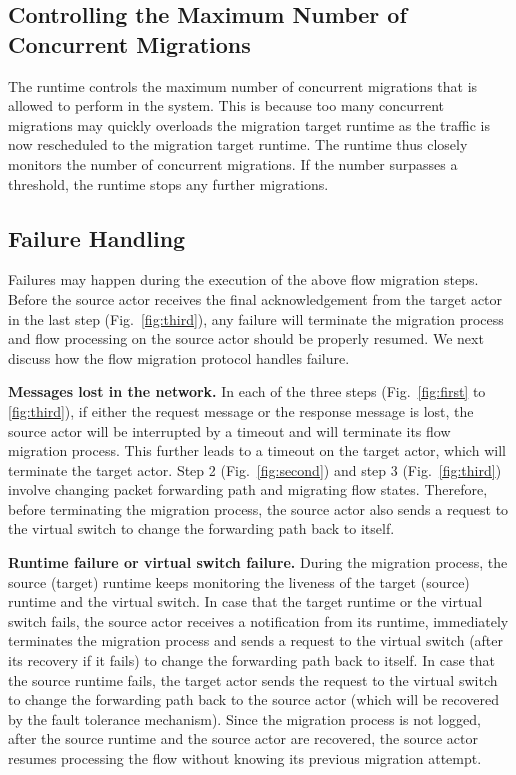 \subsection{Controlling the Maximum Number of Concurrent Migrations}

The runtime controls the maximum number of concurrent migrations that is allowed to perform in the system. This is because too many concurrent migrations may quickly overloads the migration target runtime as the traffic is now rescheduled to the migration target runtime. The runtime thus closely monitors the number of concurrent migrations. If the number surpasses a threshold, the runtime stops any further migrations. 

\subsection{Failure Handling}
 
Failures may happen during the execution of the above flow migration steps. Before the source actor receives the final acknowledgement from the target actor in the last step (Fig.~\ref{fig:third}), any failure will terminate the migration process and flow processing on the source actor should be properly resumed. We next discuss how the flow migration protocol handles failure.
 
\textbf{Messages lost in the network.} In each of the three steps (Fig.~\ref{fig:first} to \ref{fig:third}), if either
the request message or the response message is lost, the source actor will be interrupted by a timeout and will terminate its flow migration process. This further leads to a timeout on the target actor, which will terminate the target actor. Step 2 (Fig.~\ref{fig:second}) and step 3 (Fig.~\ref{fig:third}) involve changing packet forwarding path and migrating flow states. Therefore, before terminating the migration process, the source actor also sends a request to the virtual switch to change the forwarding path back to itself.

\textbf{Runtime failure or virtual switch failure.} During the migration process, the source (target) runtime keeps monitoring the liveness of the target (source) runtime and the virtual switch. %
In case that the target runtime or the virtual switch fails, the source actor receives a notification from its runtime, immediately terminates the migration process and sends a request to the virtual switch (after its recovery if it fails) to change the forwarding path back to itself. In case that the source runtime fails, the target actor sends the request to the virtual switch to change the forwarding path back to the source actor (which will be recovered by the fault tolerance mechanism). Since the migration process is not logged, after the source runtime and the source actor are recovered, the source actor resumes processing the flow without knowing its previous migration attempt. 

